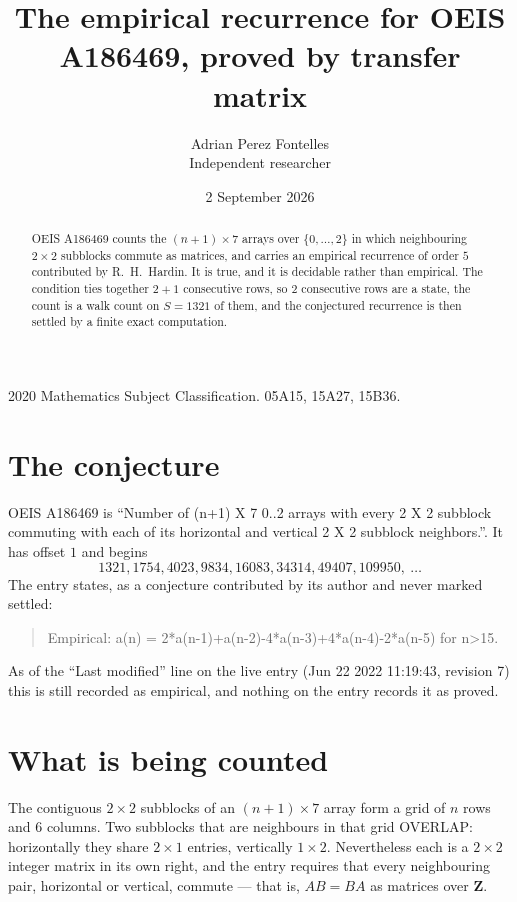 \documentclass[11pt,a4paper]{article}
\title{The empirical recurrence for OEIS A186469, proved by transfer matrix}
\author{Adrian Perez Fontelles\\ \small Independent researcher}
\date{2 September 2026}
\theoremstyle{plain}
\theoremstyle{definition}
\begin{document}
\maketitle

\begin{abstract}
OEIS A186469 counts the $(n+1)\times7$ arrays over $\{0,\dots,2\}$ in which
neighbouring $2\times2$ subblocks commute as matrices, and carries an empirical
recurrence
of order $5$ contributed by R.~H.~Hardin. It is true, and it is decidable rather than
empirical. The condition ties together $2+1$ consecutive rows, so $2$ consecutive rows are
a state, the count is a walk count on $S=1321$ of them, and the conjectured recurrence is then
settled by a finite exact computation.
\end{abstract}

\noindent\small 2020 Mathematics Subject Classification. 05A15, 15A27, 15B36.\normalsize

\section{The conjecture}

OEIS A186469 is ``Number of (n+1) X 7 0..2 arrays with every 2 X 2 subblock commuting with each of its horizontal and vertical 2 X 2 subblock neighbors.''. It has offset $1$ and begins
\[
1321, 1754, 4023, 9834, 16083, 34314, 49407, 109950,\ \dots
\]
The entry states, as a conjecture contributed by its author and never marked settled:
\begin{quote}
Empirical: a(n) = 2*a(n-1)+a(n-2)-4*a(n-3)+4*a(n-4)-2*a(n-5) for n>15.
\end{quote}
As of the ``Last modified'' line on the live entry (Jun 22 2022 11:19:43, revision 7) this is still
recorded as empirical, and nothing on the entry records it as proved.

\section{What is being counted}

The contiguous $2\times2$ subblocks of an $(n+1)\times7$ array form a grid of $n$
rows and $6$ columns. Two subblocks that are neighbours in that
grid OVERLAP: horizontally they share $2\times1$ entries, vertically
$1\times2$. Nevertheless each is a $2\times2$ integer matrix in its own right, and
the entry requires that every neighbouring pair, horizontal or vertical, commute --- that is,
$AB=BA$ as matrices over $\mathbf{Z}$.
\end{document}
